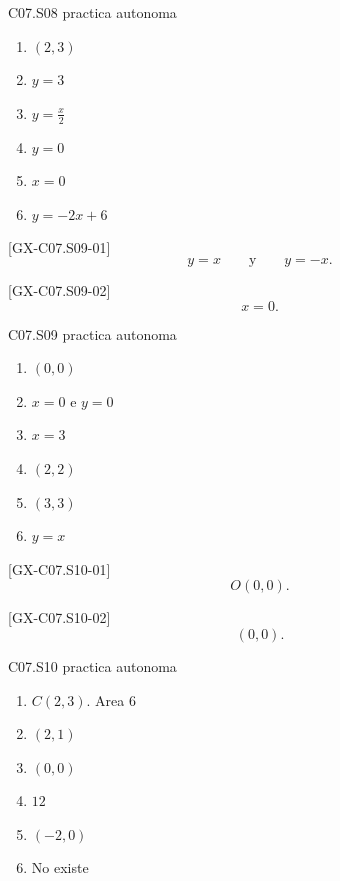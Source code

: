 \begin{shortanswer}{C07.S08 practica autonoma}
\begin{enumerate}[label=\textbf{PX-C07.S08-\arabic*:}, leftmargin=*]
  \item \((2,3)\)
  \item \(y=3\)
  \item \(y=\frac{x}{2}\)
  \item \(y=0\)
  \item \(x=0\)
  \item \(y=-2x+6\)
\end{enumerate}
\end{shortanswer}

\begin{shortanswer}{[GX-C07.S09-01]}
\[
y=x
\qquad \text{y} \qquad
y=-x.
\]
\end{shortanswer}

\begin{shortanswer}{[GX-C07.S09-02]}
\[
x=0.
\]
\end{shortanswer}

\begin{shortanswer}{C07.S09 practica autonoma}
\begin{enumerate}[label=\textbf{PX-C07.S09-\arabic*:}, leftmargin=*]
  \item \((0,0)\)
  \item \(x=0\) e \(y=0\)
  \item \(x=3\)
  \item \((2,2)\)
  \item \((3,3)\)
  \item \(y=x\)
\end{enumerate}
\end{shortanswer}

\begin{shortanswer}{[GX-C07.S10-01]}
\[
O(0,0).
\]
\end{shortanswer}

\begin{shortanswer}{[GX-C07.S10-02]}
\[
(0,0).
\]
\end{shortanswer}

\begin{shortanswer}{C07.S10 practica autonoma}
\begin{enumerate}[label=\textbf{PX-C07.S10-\arabic*:}, leftmargin=*]
  \item \(C(2,3)\). Area \(6\)
  \item \((2,1)\)
  \item \((0,0)\)
  \item \(12\)
  \item \((-2,0)\)
  \item No existe
\end{enumerate}
\end{shortanswer}
